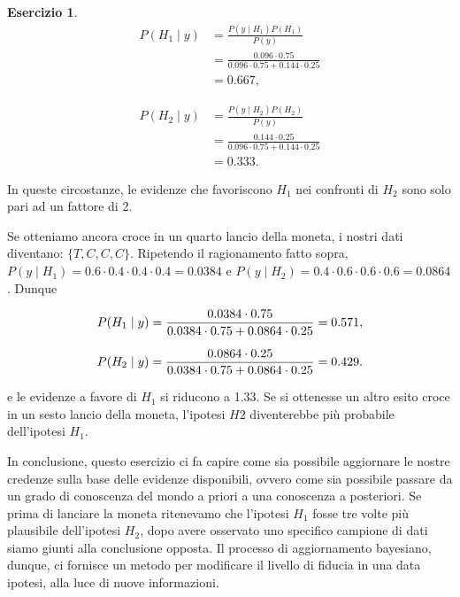 \documentclass[
  11pt,
]{krantz}
\theoremstyle{definition}
\theoremstyle{definition}
\theoremstyle{definition}
\newtheorem{exercise}{Esercizio}[chapter]
\theoremstyle{definition}
\theoremstyle{remark}
\begin{document}
\begin{exercise}
\[
\begin{split}
P(H_1 \mid y) &= \frac{P(y \mid H_1) P(H_1)}{P(y)} \\
&= \frac{0.096 \cdot 0.75}{0.096 \cdot 0.75 + 0.144 \cdot 0.25} \\
&= 0.667,
\end{split}
\]

\[
\begin{split}
P(H_2 \mid y) &= \frac{P(y \mid H_2) P(H_2)}{P(y)} \\
&= \frac{0.144 \cdot 0.25}{0.096 \cdot 0.75 + 0.144 \cdot 0.25} \\
&= 0.333.
\end{split}
\]

In queste circostanze, le evidenze che favoriscono \(H_1\) nei confronti di \(H_2\) sono solo pari ad un fattore di 2.

Se otteniamo ancora croce in un quarto lancio della moneta, i nostri dati diventano: \(\{T, C, C, C\}\). Ripetendo il ragionamento fatto sopra, \(P(y \mid H_1) = 0.6 \cdot 0.4 \cdot 0.4 \cdot 0.4 = 0.0384\) e \(P(y \mid H_2) = 0.4 \cdot 0.6 \cdot 0.6 \cdot 0.6 = 0.0864\). Dunque

\begin{equation}
P(H_1 \mid y) = \frac{0.0384 \cdot 0.75}{0.0384 \cdot 0.75 + 0.0864 \cdot 0.25} = 0.571,\notag
\end{equation}

\begin{equation}
P(H_2 \mid y) = \frac{0.0864 \cdot 0.25}{0.0384 \cdot 0.75 + 0.0864 \cdot 0.25} = 0.429.\notag
\end{equation}

e le evidenze a favore di \(H_1\) si riducono a 1.33. Se si ottenesse un altro esito croce in un sesto lancio della moneta, l'ipotesi \(H2\) diventerebbe più probabile dell'ipotesi \(H_1\).

In conclusione, questo esercizio ci fa capire come sia possibile aggiornare le nostre credenze sulla base delle evidenze disponibili, ovvero come sia possibile passare da un grado di conoscenza del mondo a priori a una conoscenza a posteriori. Se prima di lanciare la moneta ritenevamo che l'ipotesi \(H_1\) fosse tre volte più plausibile dell'ipotesi \(H_2\), dopo avere osservato uno specifico campione di dati siamo giunti alla conclusione opposta. Il processo di aggiornamento bayesiano, dunque, ci fornisce un metodo per modificare il livello di fiducia in una data ipotesi, alla luce di nuove informazioni.
\end{exercise}
\end{document}
